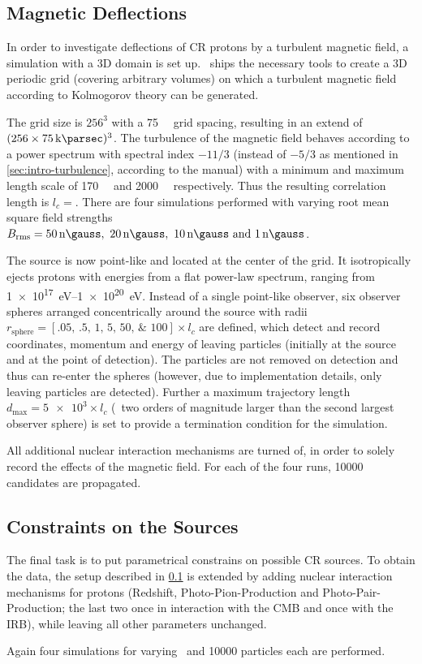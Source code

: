 \subsection{Magnetic Deflections}
\label{sec:setup-defl}
In order to investigate deflections of CR protons by a turbulent
magnetic field, a simulation with a 3D domain is set up. \CRPropa~ships the
necessary tools to create a 3D periodic grid (covering arbitrary volumes) on
which a turbulent magnetic field according to Kolmogorov theory can be
generated.

The grid size is $256^3$ with a \SI{75}{\kilo\parsec} grid spacing, resulting
in an extend of $(256\times\SI{75}{\kilo\parsec})^3$. The turbulence of the
magnetic field behaves according to a power spectrum with spectral index
$-11/3$ (instead of $-5/3$ as mentioned in \cref{sec:intro-turbulence},
according to the manual) with a minimum and maximum length scale of
\SI{170}{\kilo\parsec} and \SI{2000}{\kilo\parsec} respectively. Thus the
resulting correlation length is $l_c=$.
There are four simulations performed with varying root mean square field
strengths $\Brms=\SIlist{50;20;10;1}{\nano\gauss}$.

The source is now point-like and located at the center of the grid. It
isotropically ejects protons with energies from a flat power-law spectrum,
ranging from \SIrange{1e17}{1e20}{\electronvolt}. Instead of a single
point-like observer, six observer spheres arranged concentrically around the
source with radii
$r_{\mathrm{sphere}}=[\numlist[list-final-separator={,}]{.05;.5;1;5;50;100}]\times
l_c$ are defined, which detect and record coordinates, momentum and
energy of leaving particles (initially at the source and at the point of
detection). The particles are not removed on detection and
thus can re-enter the spheres (however, due to implementation details, only
leaving particles are detected). Further a maximum trajectory length
$d_{\mathrm{max}}=\num{5e3}\times l_c$ (\ie~two orders of magnitude larger than
the second largest observer sphere) is set to provide a termination condition
for the simulation.

All additional nuclear interaction mechanisms are turned of, in order to solely
record the effects of the magnetic field.
For each of the four runs, \num{10000} candidates are propagated.


\subsection{Constraints on the Sources}
The final task is to put parametrical constrains on possible CR sources. To
obtain the data, the setup described in \cref{sec:setup-defl} is extended by
adding nuclear interaction mechanisms for protons (Redshift,
Photo-Pion-Production and Photo-Pair-Production; the last two once in
interaction with the CMB and once with the IRB), while leaving all other
parameters unchanged.

Again four simulations for varying \Brms~and \num{10000} particles each are
performed.


